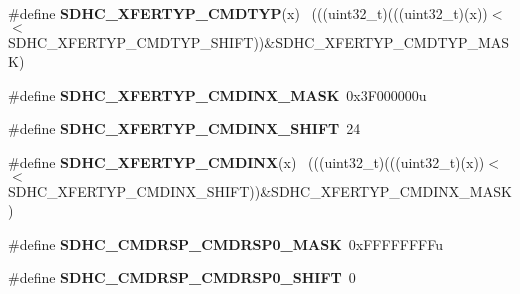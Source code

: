 \begin{DoxyCompactItemize}
\item 
\hypertarget{group___s_d_h_c___register___masks_ga2f629bc9044f5ad0d6731f28a5c7d090}{}\#define {\bfseries S\+D\+H\+C\+\_\+\+X\+F\+E\+R\+T\+Y\+P\+\_\+\+C\+M\+D\+T\+Y\+P}(x)                                  ~(((uint32\+\_\+t)(((uint32\+\_\+t)(x))$<$$<$S\+D\+H\+C\+\_\+\+X\+F\+E\+R\+T\+Y\+P\+\_\+\+C\+M\+D\+T\+Y\+P\+\_\+\+S\+H\+I\+F\+T))\&S\+D\+H\+C\+\_\+\+X\+F\+E\+R\+T\+Y\+P\+\_\+\+C\+M\+D\+T\+Y\+P\+\_\+\+M\+A\+S\+K)\label{group___s_d_h_c___register___masks_ga2f629bc9044f5ad0d6731f28a5c7d090}

\item 
\hypertarget{group___s_d_h_c___register___masks_ga38c578078fbe7eae9b211d4e75eb9dd0}{}\#define {\bfseries S\+D\+H\+C\+\_\+\+X\+F\+E\+R\+T\+Y\+P\+\_\+\+C\+M\+D\+I\+N\+X\+\_\+\+M\+A\+S\+K}~0x3\+F000000u\label{group___s_d_h_c___register___masks_ga38c578078fbe7eae9b211d4e75eb9dd0}

\item 
\hypertarget{group___s_d_h_c___register___masks_ga3ff92ff3a2de4c2006862e08e92198a2}{}\#define {\bfseries S\+D\+H\+C\+\_\+\+X\+F\+E\+R\+T\+Y\+P\+\_\+\+C\+M\+D\+I\+N\+X\+\_\+\+S\+H\+I\+F\+T}~24\label{group___s_d_h_c___register___masks_ga3ff92ff3a2de4c2006862e08e92198a2}

\item 
\hypertarget{group___s_d_h_c___register___masks_ga13e573f4fdfd45bbd7320ef8c3145b8d}{}\#define {\bfseries S\+D\+H\+C\+\_\+\+X\+F\+E\+R\+T\+Y\+P\+\_\+\+C\+M\+D\+I\+N\+X}(x)                                  ~(((uint32\+\_\+t)(((uint32\+\_\+t)(x))$<$$<$S\+D\+H\+C\+\_\+\+X\+F\+E\+R\+T\+Y\+P\+\_\+\+C\+M\+D\+I\+N\+X\+\_\+\+S\+H\+I\+F\+T))\&S\+D\+H\+C\+\_\+\+X\+F\+E\+R\+T\+Y\+P\+\_\+\+C\+M\+D\+I\+N\+X\+\_\+\+M\+A\+S\+K)\label{group___s_d_h_c___register___masks_ga13e573f4fdfd45bbd7320ef8c3145b8d}

\item 
\hypertarget{group___s_d_h_c___register___masks_ga0e18ea51c0f8c567b8c7f0c8daed3a3f}{}\#define {\bfseries S\+D\+H\+C\+\_\+\+C\+M\+D\+R\+S\+P\+\_\+\+C\+M\+D\+R\+S\+P0\+\_\+\+M\+A\+S\+K}~0x\+F\+F\+F\+F\+F\+F\+F\+Fu\label{group___s_d_h_c___register___masks_ga0e18ea51c0f8c567b8c7f0c8daed3a3f}

\item 
\hypertarget{group___s_d_h_c___register___masks_gaea81f8c10607500c0232c031cb1c736b}{}\#define {\bfseries S\+D\+H\+C\+\_\+\+C\+M\+D\+R\+S\+P\+\_\+\+C\+M\+D\+R\+S\+P0\+\_\+\+S\+H\+I\+F\+T}~0\label{group___s_d_h_c___register___masks_gaea81f8c10607500c0232c031cb1c736b}


\end{DoxyCompactItemize}
